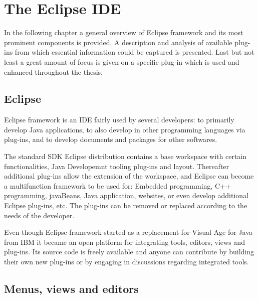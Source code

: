 \chapter{The Eclipse IDE}\label{cha:TheEclipseIDE}

In the following chapter a general overview of Eclipse framework and its most prominent components is provided. A description and analysis of available plug-ins from which essential information could be captured is presented. Last but not least a great amount of focus is given on a specific plug-in which is used and enhanced throughout the thesis.  


\section{Eclipse}
\label{sec:TheEclipseIDE:eclipse}
Eclipse framework is an IDE fairly used by several developers: to primarily develop Java applications, to also develop in other programming languages via plug-ins, and to develop documents and packages for other softwares.

The standard SDK Eclipse distribution contains a base workspace with certain functionalities, Java Developemnt tooling plug-ins and layout. Thereafter additional plug-ins allow the extension of the workspace, and Eclipse can become a multifunction framework to be used for: 
Embedded programming, C++ programming, javaBeans, Java application, 
websites, or even develop additional Eclipse plug-ins, etc. 
The plug-ins can be removed or replaced according to the needs 
of the developer.

Even though Eclipse framework started as a replacement for Visual Age for Java from IBM%
it became an open platform for integrating tools, editors, views and plug-ins. 
Its source code is freely available and anyone can contribute by building their own 
new plug-ins or by engaging in discussions regarding integrated tools.  

\section{Menus, views and editors}

